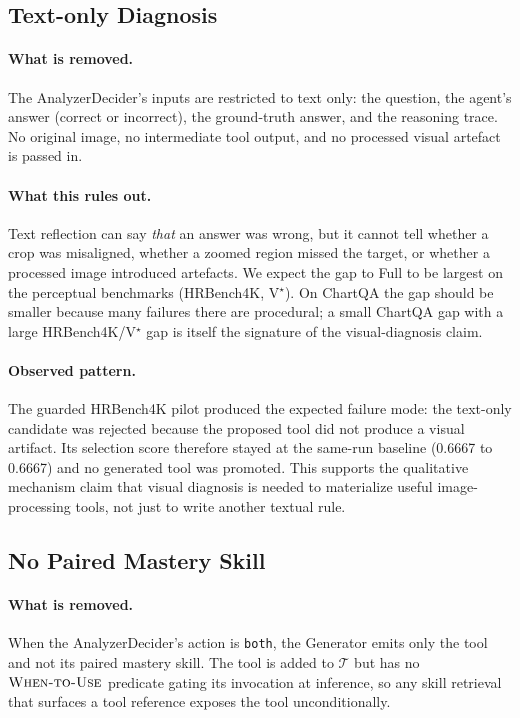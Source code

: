 \subsection{Text-only Diagnosis}
\label{app:abl_textonly}

\paragraph{What is removed.}
The AnalyzerDecider's inputs are restricted to text only: the question, the agent's answer
(correct or incorrect), the ground-truth answer, and the reasoning trace. No original
image, no intermediate tool output, and no processed visual artefact is passed in.

\paragraph{What this rules out.}
Text reflection can say \emph{that} an answer was wrong, but it cannot tell whether a
crop was misaligned, whether a zoomed region missed the target, or whether a processed
image introduced artefacts. We expect the gap to Full to be largest on the perceptual
benchmarks (HRBench4K, V$^\star$). On ChartQA the gap should be smaller because many
failures there are procedural; a small ChartQA gap with a large HRBench4K/V$^\star$ gap is
itself the signature of the visual-diagnosis claim.

\paragraph{Observed pattern.}
The guarded HRBench4K pilot produced the expected failure mode: the text-only candidate was
rejected because the proposed tool did not produce a visual artifact. Its selection score
therefore stayed at the same-run baseline (0.6667 to 0.6667) and no generated tool was
promoted. This supports the qualitative mechanism claim that visual diagnosis is needed to
materialize useful image-processing tools, not just to write another textual rule.

\subsection{No Paired Mastery Skill}
\label{app:abl_mastery}

\paragraph{What is removed.}
When the AnalyzerDecider's action is \texttt{both}, the Generator emits only the tool and
not its paired mastery skill. The tool is added to $\mathcal{T}$ but has no
$\textsc{When-to-Use}$ predicate gating its invocation at inference, so any skill
retrieval that surfaces a tool reference exposes the tool unconditionally.

